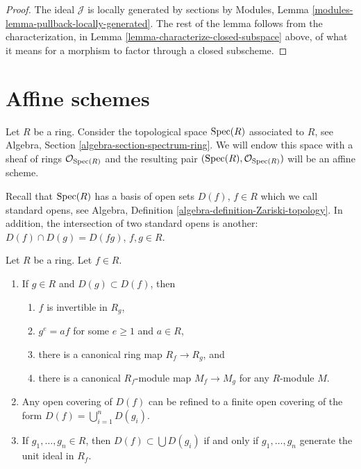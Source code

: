 \begin{proof}
The ideal $\mathcal{J}$ is locally generated by sections
by Modules, Lemma \ref{modules-lemma-pullback-locally-generated}.
The rest of the lemma follows from the characterization,
in Lemma \ref{lemma-characterize-closed-subspace} above,
of what it means for a morphism to factor through a closed
subscheme.
\end{proof}














\section{Affine schemes}
\label{section-affine-schemes}

\noindent
Let $R$ be a ring. Consider the topological space $\mathop{\rm Spec}(R)$
associated to $R$, see Algebra, Section \ref{algebra-section-spectrum-ring}.
We will endow this space with a sheaf of rings $\mathcal{O}_{\mathop{\rm Spec}(R)}$
and the resulting pair $(\mathop{\rm Spec}(R), \mathcal{O}_{\mathop{\rm Spec}(R)})$
will be an affine scheme.

\medskip\noindent
Recall that $\mathop{\rm Spec}(R)$ has a basis of open sets $D(f)$,
$f \in R$ which we call standard opens, see Algebra,
Definition \ref{algebra-definition-Zariski-topology}.
In addition, the intersection of two standard opens is another:
$D(f) \cap D(g) = D(fg)$, $f, g\in R$.

\begin{lemma}
\label{lemma-standard-open}
Let $R$ be a ring. Let $f \in R$.
\begin{enumerate}
\item If $g\in R$ and $D(g) \subset D(f)$, then
\begin{enumerate}
\item $f$ is invertible in $R_g$,
\item $g^e = af$ for some $e \geq 1$ and $a \in R$,
\item there is a canonical ring map $R_f \to R_g$, and
\item there is a canonical $R_f$-module map
$M_f \to M_g$ for any $R$-module $M$.
\end{enumerate}
\item Any open covering of $D(f)$ can be refined to a finite
open covering of the form $D(f) = \bigcup_{i = 1}^n D(g_i)$.
\item If $g_1, \ldots, g_n \in R$, then $D(f) \subset \bigcup D(g_i)$
if and only if $g_1, \ldots, g_n$ generate the unit ideal in $R_f$.
\end{enumerate}
\end{lemma}

